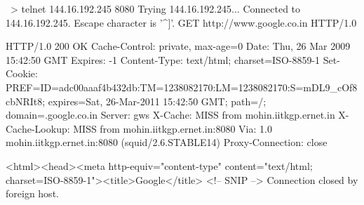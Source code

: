 ~> telnet 144.16.192.245 8080
Trying 144.16.192.245...
Connected to 144.16.192.245.
Escape character is '^]'.
GET http://www.google.co.in HTTP/1.0

HTTP/1.0 200 OK
Cache-Control: private, max-age=0
Date: Thu, 26 Mar 2009 15:42:50 GMT
Expires: -1
Content-Type: text/html; charset=ISO-8859-1
Set-Cookie: PREF=ID=adc00aaaf4b432db:TM=1238082170:LM=1238082170:S=mDL9_cOf8cbNRIt8; expires=Sat, 26-Mar-2011 15:42:50 GMT; path=/; domain=.google.co.in
Server: gws
X-Cache: MISS from mohin.iitkgp.ernet.in
X-Cache-Lookup: MISS from mohin.iitkgp.ernet.in:8080
Via: 1.0 mohin.iitkgp.ernet.in:8080 (squid/2.6.STABLE14)
Proxy-Connection: close

<html><head><meta http-equiv="content-type" content="text/html; charset=ISO-8859-1"><title>Google</title>
<!-- SNIP -->
Connection closed by foreign host.
